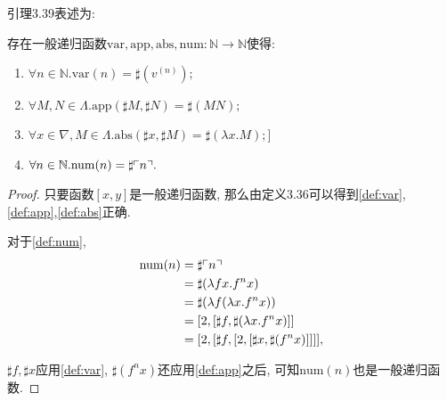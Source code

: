 
引理3.39表述为:

存在一般递归函数$\mathrm{var,app,abs,num}:\mathbb{N}\to\mathbb{N}$使得:
\begin{enumerate}[label=(\arabic*)]
    \item $\forall n\in\mathbb{N}. \mathrm{var}(n)=\sharp (v^{(n)});$\label{def:var}
    \item $\forall M, N\in \Lambda. \mathrm{app}(\sharp M,\sharp N)=\sharp (MN);$\label{def:app}
    \item $\forall x\in\nabla, M\in\Lambda. \mathrm{abs}(\sharp x, \sharp M) = \sharp(\lambda x. M);$]\label{def:abs}
    \item $\forall n\in\mathbb{N}. \mathrm{num}(n)=\sharp\ulcorner{n}\urcorner.$\label{def:num}
\end{enumerate}

\begin{proof}
    只要函数$[x,y]$是一般递归函数, 那么由定义3.36可以得到\ref{def:var},\ref{def:app},\ref{def:abs}正确.
    
    对于\ref{def:num}, 
    $$\begin{aligned}
        \mathrm{num}(n)&=\sharp\ulcorner{n}\urcorner\\
        &=\sharp(\lambda fx.f^nx)\\
        &=\sharp(\lambda f(\lambda x.f^nx))\\
        &=[2,[\sharp f, \sharp (\lambda x.f^nx)]]\\
        &=[2,[\sharp f, [2, [\sharp x, \sharp (f^nx)]]]],
    \end{aligned}$$
    
    $\sharp f, \sharp x$应用\ref{def:var}, $\sharp (f^nx)$还应用\ref{def:app}之后, 可知$\mathrm{num}(n)$也是一般递归函数.
\end{proof}
